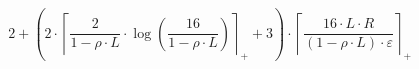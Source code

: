 \[2 + \left(2 \cdot \left\lceil \frac{2}{1 - \rho \cdot L} \cdot \log\left(\frac{16}{1 - \rho \cdot L}\right) \right\rceil_{+} + 3\right) \cdot \left\lceil \frac{16 \cdot L \cdot R}{\left(1 - \rho \cdot L\right) \cdot \varepsilon} \right\rceil_{+}\]
